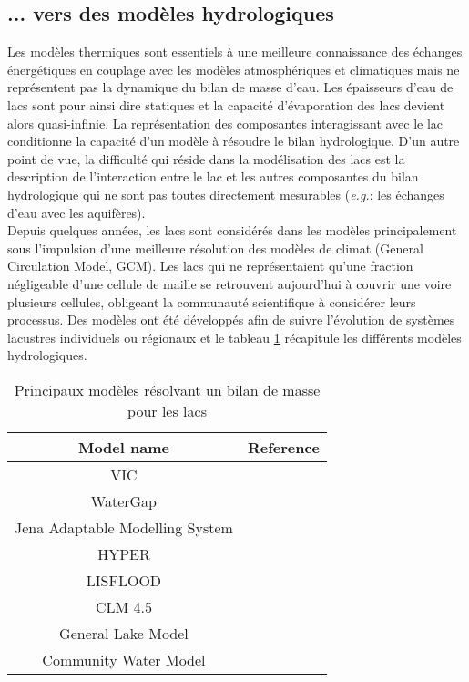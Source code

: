 \subsection{{\selectfont ... vers des modèles hydrologiques}}

Les modèles thermiques sont essentiels à une meilleure connaissance des échanges énergétiques en couplage avec les modèles atmosphériques et climatiques mais ne représentent pas la dynamique du bilan de masse d’eau. Les épaisseurs d'eau de lacs sont pour ainsi dire statiques et la capacité d'évaporation des lacs devient alors quasi-infinie. La représentation des composantes interagissant avec le lac conditionne la capacité d’un modèle à résoudre le bilan hydrologique. D’un autre point de vue, la difficulté qui réside dans la modélisation des lacs est la description de l’interaction entre le lac et les autres composantes du bilan hydrologique qui ne sont pas toutes directement mesurables (\textit{e.g.}: les échanges d’eau avec les aquifères). \\
Depuis quelques années, les lacs sont considérés dans les modèles principalement sous l'impulsion d'une meilleure résolution des modèles de climat (General Circulation Model, GCM). Les lacs qui ne représentaient qu'une fraction négligeable d'une cellule de maille se retrouvent aujourd'hui à couvrir une voire plusieurs cellules, obligeant la communauté scientifique à considérer leurs processus. Des modèles ont été développés afin de suivre l’évolution de systèmes lacustres individuels ou régionaux et le tableau \ref{tab_masse} récapitule les différents modèles hydrologiques. \\

\begin{table}[h!]
\centering
 \caption{Principaux modèles résolvant un bilan de masse pour les lacs}
 \label{tab_masse}
 \begin{tabularx}{\textwidth}{cc}
 \hline
 Model name & Reference \\
 \hline
  VIC&\citet{cherkauer2003}\\
  WaterGap&\citet{hunger2008} \\
  Jena Adaptable Modelling System&\citet{krause2010}\\
  HYPER&\citet{lindstrom2010}\\
  LISFLOOD&\citet{burek2013}\\
  CLM 4.5&\citet{thiery2017b}\\
  General Lake Model&\citet{hipsey2019}\\
  Community Water Model&\citet{burek2019}\\
  \hline
 \end{tabularx}
\end{table}

